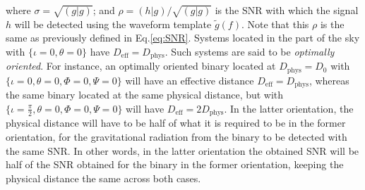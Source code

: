 \documentclass[aps,
prd,
amsmath,
amssymb,
twocolumn,
floatfix,
groupedaddress]{revtex4-1}
\newcommand{\eff}{\mathrm{eff}}
\newcommand{\phys}{\mathrm{phys}}
\begin{document}
where $\sigma=\sqrt{(g|g)}$; and $\rho=(h|g)/\sqrt{(g|g)}$ is the SNR with which the signal $h$ will be detected using the waveform template $\tilde{g}(f)$. Note that this $\rho$ is the same as previously defined in Eq.\eqref{eq:SNR}. Systems located in the part of the sky with $\{\iota=0,\theta=0\}$ have $D_{\eff} = D_{\phys}$. Such systems are said to be \textit{optimally oriented}. For instance, an optimally oriented binary located at $D_{\phys}=D_0$ with $\{\iota=0,\theta=0,\Phi=0,\Psi=0\}$ will have an effective distance $D_{\eff} = D_{\phys}$, whereas the same binary located at the same physical distance, but with $\{\iota=\frac{\pi}{2},\theta=0,\Phi=0,\Psi=0\}$ will have $D_{\eff} = 2D_{\phys}$. In the latter orientation, the physical distance will have to be half of what it is required to be in the former orientation, for the gravitational radiation from the binary to be detected with the same SNR. In other words, in the latter orientation the obtained SNR will be half of the SNR obtained for the 
binary in the former orientation, keeping the physical distance the same across both cases.
\end{document}
